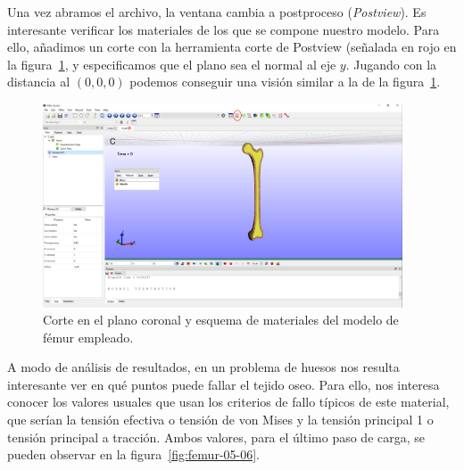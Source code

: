 Una vez abramos el archivo, la ventana cambia a postproceso (\emph{Postview}). Es interesante verificar los materiales de los que se compone nuestro modelo. Para ello, añadimos un corte con la herramienta corte de Postview (señalada en rojo en la figura~\ref{fig:femur4}, y especificamos que el plano sea el normal al eje $y$. Jugando con la distancia al $(0,0,0)$ podemos conseguir una visión similar a la de la  figura~\ref{fig:femur4}.

  \begin{figure}[!htp]
\centering
\includegraphics[width=0.95\textwidth]{figuras_2/femur4.png}
\caption{Corte en el plano coronal y esquema de materiales del modelo de fémur empleado.}
\label{fig:femur4}
\end{figure}

A modo de análisis de resultados, en un problema de huesos nos resulta interesante ver en qué puntos puede fallar el tejido oseo. Para ello, nos interesa conocer los valores usuales que usan los criterios de fallo típicos de este material, que serían la tensión efectiva o tensión de von Mises y la tensión principal 1 o tensión principal a tracción. Ambos valores, para el último paso de carga, se pueden observar en la figura~\ref{fig:femur-05-06}.

